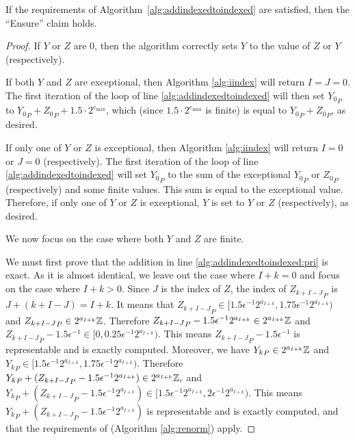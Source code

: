     \begin{thm}
      If the requirements of Algorithm~\ref{alg:addindexedtoindexed} are satisfied, then the ``Ensure'' claim holds.
      \label{thm:addindexedtoindexed}
    \end{thm}
    \begin{proof}
      If $Y$ or $Z$ are 0, then the algorithm correctly sets $Y$ to the value of $Z$ or $Y$ (respectively).

      If both $Y$ and $Z$ are exceptional, then Algorithm \ref{alg:iindex} will return $I = J = 0$. The first iteration of the loop of line \ref{alg:addindexedtoindexed} will then set ${Y_{0}}_P$ to ${Y_{0}}_P + {Z_{0}}_P + 1.5 \cdot 2^{e_{\max}}$, which (since $1.5 \cdot 2^{e_{\max}}$ is finite) is equal to ${Y_{0}}_P + {Z_{0}}_P$, as desired.

      If only one of $Y$ or $Z$ is exceptional, then Algorithm \ref{alg:iindex} will return $I = 0$ or $J = 0$ (respectively). The first iteration of the loop of line \ref{alg:addindexedtoindexed} will set ${Y_{0}}_P$ to the sum of the exceptional ${Y_0}_P$ or ${Z_0}_P$ (respectively) and some finite values. This sum is equal to the exceptional value. Therefore, if only one of $Y$ or $Z$ is exceptional, $Y$ is set to $Y$ or $Z$ (respectively), as desired.

      We now focus on the case where both $Y$ and $Z$ are finite.

      We must first prove that the addition in line \ref{alg:addindexedtoindexed:pri} is exact. As it is almost identical, we leave out the case where $I + k = 0$ and focus on the case where $I + k > 0$.
      Since $J$ is the index of $Z$, the index of ${Z_{k + I-J}}_P$ is
      $J + (k + I -J) = I + k$. It means that
      \(
        {Z_{k + I-J}}_P \in [1.5 \epsilon^{-1} 2^{a_{I+k}}, 1.75 \epsilon^{-1} 2^{a_{I+k}})
      \)
      and ${Z_{k + I-J}}_P \in 2^{a_{I+k}} \mathbb{Z}$.
      Therefore ${Z_{k + I-J}}_P - 1.5 \epsilon^{-1}  2^{a_{I+k}} \in 2^{a_{I+k}} \mathbb{Z}$
      and ${Z_{k + I-J}}_P - 1.5 \epsilon^{-1} \in [0, 0.25 \epsilon^{-1} 2^{a_{I+k}})$.
      This means ${Z_{k + I-J}}_P - 1.5 \epsilon^{-1}$ is representable and is
      exactly computed.
      Moreover, we have ${Y_{k}}_P \in 2^{a_{I+k}} \mathbb{Z}$ and
      \(
        {Y_{k}}_P \in [1.5 \epsilon^{-1} 2^{a_{I+k}}, 1.75 \epsilon^{-1} 2^{a_{I+k}})
      \).
      Therefore
      \(
        {Y_{k}}_P + ({Z_{k + I-J}}_P - 1.5 \epsilon^{-1}  2^{a_{I+k}})
          \in 2^{a_{I+k}} \mathbb{Z},
      \)
      and
      \(
        {Y_{k}}_P + ({Z_{k + I-J}}_P - 1.5 \epsilon^{-1}  2^{a_{I+k}})
          \in [1.5 \epsilon^{-1} 2^{a_{I+k}}, 2 \epsilon^{-1} 2^{a_{I+k}})
      \).
      This means ${Y_{k}}_P + ({Z_{k + I-J}}_P - 1.5 \epsilon^{-1}  2^{a_{I+k}})$
      is representable and is exactly computed, and that the requirements of  (Algorithm \ref{alg:renorm}) apply.


\end{proof}
